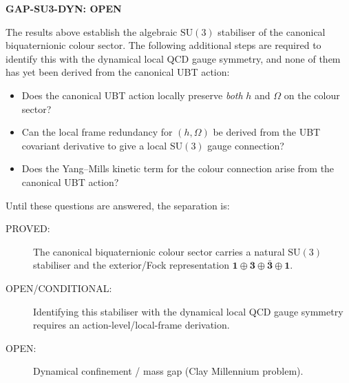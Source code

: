 \documentclass[12pt,a4paper]{article}
\theoremstyle{definition}
\theoremstyle{remark}
\begin{document}
\begin{gapbox}
\textbf{GAP-SU3-DYN: OPEN}

The results above establish the algebraic $\mathrm{SU}(3)$ stabiliser of the
canonical biquaternionic colour sector.  The following additional steps are
required to identify this with the dynamical local QCD gauge symmetry, and
none of them has yet been derived from the canonical UBT action:

\begin{itemize}
  \item Does the canonical UBT action locally preserve \emph{both} $h$ and
        $\Omega$ on the colour sector?
  \item Can the local frame redundancy for $(h,\Omega)$ be derived from the
        UBT covariant derivative to give a local $\mathrm{SU}(3)$ gauge connection?
  \item Does the Yang--Mills kinetic term for the colour connection arise from
        the canonical UBT action?
\end{itemize}

Until these questions are answered, the separation is:

\begin{description}
  \item[PROVED:] The canonical biquaternionic colour sector carries a natural
    $\mathrm{SU}(3)$ stabiliser and the exterior/Fock representation
    $\mathbf{1}\oplus\mathbf{3}\oplus\bar{\mathbf{3}}\oplus\mathbf{1}$.
  \item[OPEN/CONDITIONAL:] Identifying this stabiliser with the dynamical
    local QCD gauge symmetry requires an action-level/local-frame derivation.
  \item[OPEN:] Dynamical confinement / mass gap (Clay Millennium problem).
\end{description}
\end{gapbox}

\ifdefined\INCLUDEMODE
\else
\end{document}
